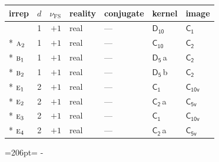 \documentclass[10pt,a4paper]{article}
\newcommand{\needspace}[1]{\par\penalty-100\begingroup\dimen0=#1\relax\dimen2=\pagegoal
  \advance\dimen2-\pagetotal\ifdim\dimen0>\dimen2\relax\ifdim\dimen2>0pt\vfil\break\fi\fi
  \endgroup}
\numberwithin{equation}{section}
\newcommand{\grp}[1]{\mathsf{#1}}
\newcommand{\irr}[1]{\text{\normalfont\scshape #1}}
\newcommand{\detbox}[1]{{\setlength{\fboxsep}{1pt}\fbox{#1}}}
\newcommand{\clsletter}[1]{\,{\scriptsize\color{black!55}#1}}
\newcommand{\fsind}{\nu_{\mathrm{FS}}}
\begin{document}
{\small\renewcommand{\arraystretch}{1.25}\begin{longtable}{@{}lrrllll@{}}\toprule
irrep & $d$ & $\fsind$ & reality & conjugate & kernel & image\\\midrule\endhead
\bottomrule\endfoot\endlastfoot
\detbox{$\irr{a}_{1}$} & 1 & $+1$ & real & --- & \href{D10.pdf}{$\grp{D_{10}}$} & \href{C1.pdf}{$\grp{C_{1}}$}\\*
$\irr{a}_{2}$ & 1 & $+1$ & real & --- & \href{C10.pdf}{$\grp{C_{10}}$} & \href{C2.pdf}{$\grp{C_{2}}$}\\*
$\irr{b}_{1}$ & 1 & $+1$ & real & --- & \href{D5.pdf}{$\grp{D_{5}}$}\clsletter{a} & \href{C2.pdf}{$\grp{C_{2}}$}\\*
$\irr{b}_{2}$ & 1 & $+1$ & real & --- & \href{D5.pdf}{$\grp{D_{5}}$}\clsletter{b} & \href{C2.pdf}{$\grp{C_{2}}$}\\*
$\irr{e}_{1}$ & 2 & $+1$ & real & --- & \href{C1.pdf}{$\grp{C_{1}}$} & \href{C10v.pdf}{$\grp{C_{10v}}$}\\*
$\irr{e}_{2}$ & 2 & $+1$ & real & --- & \href{C2.pdf}{$\grp{C_{2}}$}\clsletter{a} & \href{C5v.pdf}{$\grp{C_{5v}}$}\\*
$\irr{e}_{3}$ & 2 & $+1$ & real & --- & \href{C1.pdf}{$\grp{C_{1}}$} & \href{C10v.pdf}{$\grp{C_{10v}}$}\\*
$\irr{e}_{4}$ & 2 & $+1$ & real & --- & \href{C2.pdf}{$\grp{C_{2}}$}\clsletter{a} & \href{C5v.pdf}{$\grp{C_{5v}}$}\\
\bottomrule\end{longtable}}
\needspace{206pt}
\end{document}
